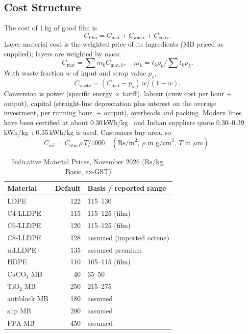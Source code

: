 \documentclass[conference,a4paper]{IEEEtran}
\begin{document}
\subsection{Cost Structure}
The cost of 1\,kg of good film is
\begin{equation}
C_{\text{film}}=C_{\text{mat}}+C_{\text{waste}}+C_{\text{conv}}. \label{eq:cost}
\end{equation}
Layer material cost is the weighted price of its ingredients (MB priced as supplied); layers are weighted by mass:
\begin{equation}
C_{\text{mat}}=\textstyle\sum m_kC_{\text{mat},k},\quad m_k=t_k\rho_k\big/\sum t_k\rho_k. \label{eq:mat}
\end{equation}
With waste fraction $w$ of input and scrap value $p_s$,
\begin{equation}
C_{\text{waste}}=(C_{\text{mat}}-p_s)\,w/(1-w). \label{eq:waste}
\end{equation}
Conversion is power (specific energy $\times$ tariff), labour (crew cost per hour $\div$ output), capital (straight-line depreciation plus interest on the average investment, per running hour, $\div$ output), overheads and packing. Modern lines have been certified at about 0.30\,kWh/kg~\cite{psa} and Indian suppliers quote 0.30--0.39\,kWh/kg~\cite{affluent}; 0.35\,kWh/kg is used. Customers buy area, so
\begin{equation}
C_{\text{m}^2}=C_{\text{film}}\,\rho\,T/1000\quad(\text{Rs/m}^2,\ \rho\text{ in g/cm}^3,\ T\text{ in }\mu\text{m}). \label{eq:m2}
\end{equation}

\begin{table}[!t]
\caption{Indicative Material Prices, November 2026 (Rs/kg, Basic, ex-GST)}
\label{tab:prices}\centering\footnotesize
\begin{tabular}{lrl}
\toprule
Material & Default & Basis / reported range \\
\midrule
LDPE & 122 & 115--130~\cite{ofb1} \\
C4-LLDPE & 115 & 115--125 (film)~\cite{ofb2} \\
C6-LLDPE & 120 & 115--125 (film)~\cite{ofb2} \\
C8-LLDPE & 128 & assumed (imported octene) \\
mLLDPE & 135 & assumed premium~\cite{emr} \\
HDPE & 110 & 105--115 (film)~\cite{ofb1} \\
CaCO$_3$ MB & 40 & 35--50~\cite{indiamart} \\
TiO$_2$ MB & 250 & 215--275~\cite{indiamart} \\
antiblock MB & 180 & assumed \\
slip MB & 200 & assumed \\
PPA MB & 450 & assumed \\
\bottomrule
\end{tabular}
\end{table}
\end{document}
